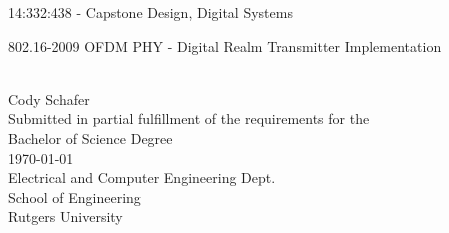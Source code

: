 
\begin{titlepage}
\begin{center}

\vspace*{\fill}

	{14:332:438 - Capstone Design, Digital Systems}	\\
	\begin{huge}{802.16-2009 OFDM PHY - Digital Realm Transmitter Implementation}\end{huge} \\
	{Cody Schafer}  \\
	{\small
		Submitted in partial fulfillment of the requirements for the \\
		Bachelor of Science Degree
	} \\
	{\today} \\
	{\small
		Electrical and Computer Engineering Dept. \\
		School of Engineering \\
		Rutgers University
	}

\vspace*{\fill}
%

\end{center}
\end{titlepage}
